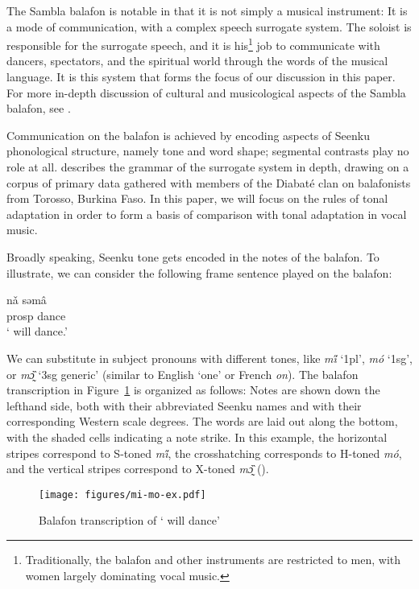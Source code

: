 \documentclass[output=paper]{langscibook}
\begin{document}
The Sambla balafon is notable in that it is not simply a musical instrument: It is a mode of communication, with a complex speech surrogate system. The soloist is responsible for the surrogate speech, and it is his\footnote{Traditionally, the balafon and other instruments are restricted to men, with women largely dominating vocal music.} job to communicate with dancers, spectators, and the spiritual world through the words of the musical language. It is this system that forms the focus of our discussion in this paper. For more in-depth discussion of cultural and musicological aspects of the Sambla balafon, see \citet{Strand2009}.

Communication on the balafon is achieved by encoding aspects of Seenku phonological structure, namely tone and word shape; segmental contrasts play no role at all. \citet{McPherson2019a} describes the grammar of the surrogate system in depth, drawing on a corpus of primary data gathered with members of the Diabaté clan on balafonists from Torosso, Burkina Faso. In this paper, we will focus on  the rules of tonal adaptation in order to form a basis of comparison with tonal adaptation in vocal music.

Broadly speaking, Seenku tone gets encoded in the notes of the balafon. To illustrate, we can consider the following frame sentence played on the balafon:

\ea 
\gll \underline{\hspace{1cm}} nǎ səmâ \\
\underline{\hspace{1cm}} {\sc prosp} dance \\
\glt `\underline{\hspace{1cm}} will dance.' 
\z 

We can substitute in subject pronouns with different tones, like \textit{mi̋} `1pl', \textit{mó} `1sg', or \textit{mɔ̰̏} `3sg generic' (similar to English `one' or French \textit{on}). The balafon transcription in Figure~\ref{will-dance} is organized as follows: Notes are shown down the lefthand side, both with their abbreviated Seenku names and with their corresponding Western scale degrees. The words are laid out along the bottom, with the shaded cells indicating a note strike. In this example, the horizontal stripes correspond to S-toned \textit{mi̋}, the crosshatching corresponds to H-toned \textit{mó}, and the vertical stripes correspond to X-toned \textit{mɔ̰̏} ().

\begin{figure}
  \texttt{[image: figures/mi-mo-ex.pdf]}
  \caption{Balafon transcription of  `\underline{\hspace{1cm}} will dance'}\label{will-dance}  
\end{figure}
\end{document}
